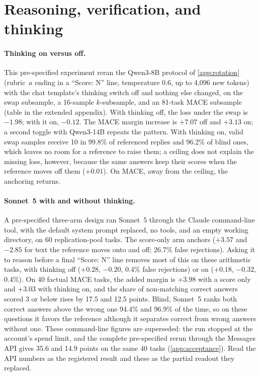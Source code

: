 \FloatBarrier
\section{Reasoning, verification, and thinking}
\label{app:reasoning}
\paragraph{Thinking on versus off.}
This pre-specified experiment reran the Qwen3-8B protocol of \cref{app:rotation} (rubric~$a$ ending in a ``Score: N'' line, temperature 0.6, up to 4,096 new tokens) with the chat template's thinking switch off and nothing else changed, on the swap subsample, a 16-sample $k$-subsample, and an 81-task \textsc{MACE} subsample (table in the extended appendix). With thinking off, the loss under the swap is $-1.98$; with it on, $-0.12$. The \textsc{MACE} margin increase is $+7.07$ off and $+3.13$ on; a second toggle with Qwen3-14B repeats the pattern. With thinking on, valid swap samples receive 10 in 99.8\% of referenced replies and 96.2\% of blind ones, which leaves no room for a reference to raise them; a ceiling does not explain the missing loss, however, because the same answers keep their scores when the reference moves off them ($+0.01$). On \textsc{MACE}, away from the ceiling, the anchoring returns.

\paragraph{Sonnet~5 with and without thinking.}
A pre-specified three-arm design ran Sonnet~5 through the Claude command-line tool, with the default system prompt replaced, no tools, and an empty working directory, on 60 replication-pool tasks. The score-only arm anchors ($+3.57$ and $-2.85$ for text the reference moves onto and off; 26.7\% false rejections). Asking it to reason before a final ``Score: N'' line removes most of this on these arithmetic tasks, with thinking off ($+0.28$, $-0.20$, 0.4\% false rejections) or on ($+0.18$, $-0.32$, 0.4\%).\pre{} On 40 factual \textsc{MACE} tasks, the added margin is $+3.98$  with a score only and $+3.03$  with thinking on, and the share of non-matching correct answers scored 3 or below rises by 17.5 and 12.5 points. Blind, Sonnet~5 ranks both correct answers above the wrong one 94.4\% and 96.9\% of the time, so on these questions it favors the reference although it separates correct from wrong answers without one.\pre{} These command-line figures are superseded: the run stopped at the account's spend limit, and the complete pre-specified rerun through the Messages API gives 35.6 and 14.9 points on the same 40 tasks (\cref{app:acceptance}). Read the API numbers as the registered result and these as the partial readout they replaced.

